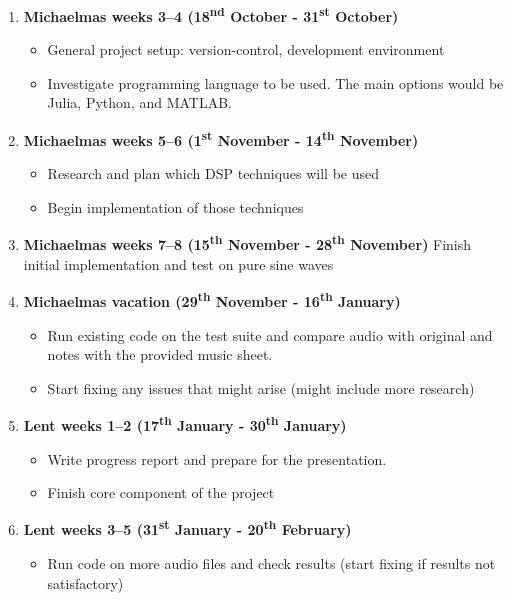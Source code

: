 \documentclass[12pt,a4paper,twoside]{article}
\begin{document}
\begin{enumerate}

\item \textbf{Michaelmas weeks 3--4 (18\textsuperscript{nd} October - 31\textsuperscript{st} October)}
  \begin{itemize}
    \item General project setup: version-control, development environment
    \item Investigate programming language to be used. The main options would be Julia, Python, and MATLAB.
  \end{itemize}

\item \textbf{Michaelmas weeks 5--6 (1\textsuperscript{st} November - 14\textsuperscript{th} November)}
  \begin{itemize}
    \item Research and plan which DSP techniques will be used
    \item Begin implementation of those techniques
  \end{itemize}

\item \textbf{Michaelmas weeks 7--8 (15\textsuperscript{th} November - 28\textsuperscript{th} November)}
  Finish initial implementation and test on pure sine waves

\item \textbf{Michaelmas vacation (29\textsuperscript{th} November - 16\textsuperscript{th} January)}
  \begin{itemize}
  \item Run existing code on the test suite and compare audio with original and notes with the provided music sheet.
  \item Start fixing any issues that might arise (might include more research)
  \end{itemize}

\item \textbf{Lent weeks 1--2 (17\textsuperscript{th} January - 30\textsuperscript{th} January)}
  \begin{itemize}
    \item Write progress report and prepare for the presentation.
    \item Finish core component of the project
  \end{itemize}

\item \textbf{Lent weeks 3--5 (31\textsuperscript{st} January - 20\textsuperscript{th} February)}
  \begin{itemize}
    \item Run code on more audio files and check results (start fixing if results not satisfactory)
  \end{itemize}


\end{enumerate}
\end{document}
